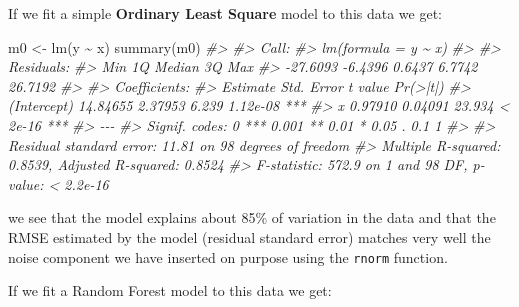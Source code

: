\documentclass[
  graybox,natbib,nospthms]{svmono}
\newenvironment{Shaded}{\begin{snugshade}}{\end{snugshade}}
\newcommand{\CommentTok}[1]{\textcolor[rgb]{0.37,0.37,0.37}{\textit{#1}}}
\newcommand{\FunctionTok}[1]{\textcolor[rgb]{0,0,0}{#1}}
\newcommand{\NormalTok}[1]{#1}
\newcommand{\OtherTok}[1]{\textcolor[rgb]{0.37,0.37,0.37}{#1}}
\newcommand{\SpecialCharTok}[1]{\textcolor[rgb]{0,0,0}{#1}}
\begin{document}
If we fit a simple \textbf{Ordinary Least Square} model to this data we get:

\begin{Shaded}
\begin{Highlighting}[]
\NormalTok{m0 }\OtherTok{\textless{}{-}} \FunctionTok{lm}\NormalTok{(y }\SpecialCharTok{\textasciitilde{}}\NormalTok{ x)}
\FunctionTok{summary}\NormalTok{(m0)}
\CommentTok{\#\textgreater{} }
\CommentTok{\#\textgreater{} Call:}
\CommentTok{\#\textgreater{} lm(formula = y \textasciitilde{} x)}
\CommentTok{\#\textgreater{} }
\CommentTok{\#\textgreater{} Residuals:}
\CommentTok{\#\textgreater{}      Min       1Q   Median       3Q      Max }
\CommentTok{\#\textgreater{} {-}27.6093  {-}6.4396   0.6437   6.7742  26.7192 }
\CommentTok{\#\textgreater{} }
\CommentTok{\#\textgreater{} Coefficients:}
\CommentTok{\#\textgreater{}             Estimate Std. Error t value Pr(\textgreater{}|t|)    }
\CommentTok{\#\textgreater{} (Intercept) 14.84655    2.37953   6.239 1.12e{-}08 ***}
\CommentTok{\#\textgreater{} x            0.97910    0.04091  23.934  \textless{} 2e{-}16 ***}
\CommentTok{\#\textgreater{} {-}{-}{-}}
\CommentTok{\#\textgreater{} Signif. codes:  0 \textquotesingle{}***\textquotesingle{} 0.001 \textquotesingle{}**\textquotesingle{} 0.01 \textquotesingle{}*\textquotesingle{} 0.05 \textquotesingle{}.\textquotesingle{} 0.1 \textquotesingle{} \textquotesingle{} 1}
\CommentTok{\#\textgreater{} }
\CommentTok{\#\textgreater{} Residual standard error: 11.81 on 98 degrees of freedom}
\CommentTok{\#\textgreater{} Multiple R{-}squared:  0.8539, Adjusted R{-}squared:  0.8524 }
\CommentTok{\#\textgreater{} F{-}statistic: 572.9 on 1 and 98 DF,  p{-}value: \textless{} 2.2e{-}16}
\end{Highlighting}
\end{Shaded}

we see that the model explains about 85\% of variation in the data and that the
RMSE estimated by the model (residual standard error) matches very well the
noise component we have inserted on purpose using the \texttt{rnorm} function.

If we fit a Random Forest model to this data we get:
\end{document}
